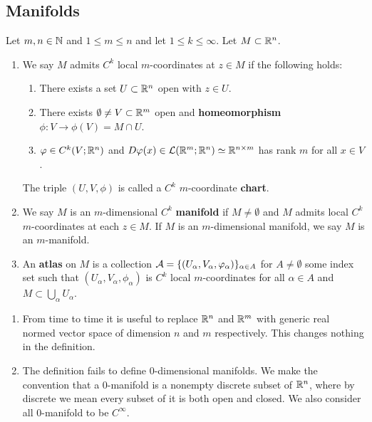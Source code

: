 \documentclass[a4paper]{article}
\begin{document}
\subsection{Manifolds}

\begin{defi}
Let $m, n \in \mathbb{N}$ and $1 \leq m \leq n$ and let 
$1 \leq k \leq \infty$. Let $M \subset \mathbb{R}^n$.
\begin{enumerate}
\item We say $M$ admits $C^k$ local $m$-coordinates 
at $z \in M$ if the following holds: 
\begin{enumerate}
  \item There exists a set $U \subset \mathbb{R}^n$ open with 
  $z \in U$.

  \item There exists $\emptyset \neq V \subset \mathbb{R}^m$ open 
  and \textbf{homeomorphism} $\phi : V \to \phi(V) = M 
  \cap U$. 

  \item $\varphi \in C^k(V ; \mathbb{R}^n)$ and $D \varphi(x) \in \mathcal{L}(\mathbb{R}^m; 
  \mathbb{R}^n) \simeq \mathbb{R}^{n \times m}$ has rank $m$ for all 
  $x \in V$.
\end{enumerate}
The triple $(U, V, \phi)$ is called a $C^k$ $m$-coordinate 
\textbf{chart}.

\item We say $M$ is an $m$-dimensional $C^k$ \textbf{manifold}
if $M \neq \emptyset$ and $M$ admits local $C^k$ $m$-coordinates
at each $z \in M$. If $M$ is an $m$-dimensional manifold, 
we say $M$ is an $m$-manifold.

\item An \textbf{atlas} on $M$ is a collection 
$\mathcal{A} = \{(U_\alpha, V_\alpha, \varphi_\alpha)\}_{\alpha \in A}$
for $A \neq \emptyset$ some index set such that 
$(U_\alpha, V_\alpha, \phi_\alpha)$ is $C^k$ local $m$-coordinates 
for all $\alpha \in A$ and $M \subset 
\bigcup_\alpha U_\alpha$.
\end{enumerate}
\end{defi}

\begin{remark}
\begin{enumerate}
\item From time to time it is useful to replace $\mathbb{R}^n$
and $\mathbb{R}^m$ with generic real normed vector space of 
dimension $n$ and $m$ respectively. This changes nothing 
in the definition.

\item The definition fails to define $0$-dimensional 
manifolds. We make the convention that a $0$-manifold is a 
nonempty discrete subset of $\mathbb{R}^n$, where by discrete we mean 
every subset of it is both open and closed. We also consider 
all $0$-manifold to be $C^\infty$.
\end{enumerate}
\end{remark}
\end{document}
